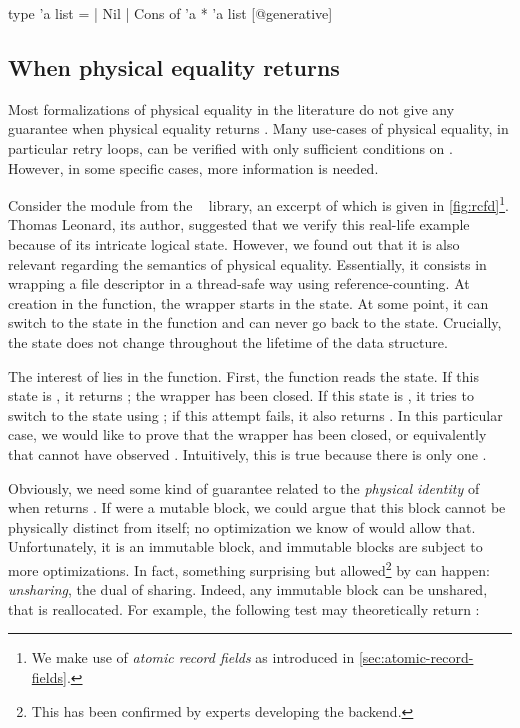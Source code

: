 \begin{ocamlcode}
type 'a list =
  | Nil
  | Cons of 'a * 'a list [@generative]
\end{ocamlcode}

\subsection{When physical equality returns }



Most formalizations of physical equality in the literature do not give any guarantee when physical equality returns .
Many use-cases of physical equality, in particular retry loops, can be verified with only sufficient conditions on .
However, in some specific cases, more information is needed.

Consider the  module from the \Eio~\cite{eio} library, an excerpt of which is given in \cref{fig:rcfd}\footnote{We make use of \emph{atomic record fields} as introduced in \cref{sec:atomic-record-fields}.}.
Thomas Leonard, its author, suggested that we verify this real-life example because of its intricate logical state.
However, we found out that it is also relevant regarding the semantics of physical equality.
Essentially, it consists in wrapping a file descriptor in a thread-safe way using reference-counting.
At creation in the  function, the wrapper starts in the  state.
At some point, it can switch to the  state in the  function and can never go back to the  state.
Crucially, the  state does not change throughout the lifetime of the data structure.

The interest of  lies in the  function.
First, the function reads the state.
If this state is , it returns ; the wrapper has been closed.
If this state is , it tries to switch to the  state using ; if this attempt fails, it also returns .
In this particular case, we would like to prove that the wrapper has been closed, or equivalently that  cannot have observed .
Intuitively, this is true because there is only one .

Obviously, we need some kind of guarantee related to the \emph{physical identity} of  when  returns .
If  were a mutable block, we could argue that this block cannot be physically distinct from itself; no optimization we know of would allow that.
Unfortunately, it is an immutable block, and immutable blocks are subject to more optimizations.
In fact, something surprising but allowed\footnote{This has been confirmed by \OCaml experts developing the \Flambda backend.} by \OCaml can happen: \emph{unsharing}, the dual of sharing.
Indeed, any immutable block can be unshared, that is reallocated.
For example, the following test may theoretically return :

